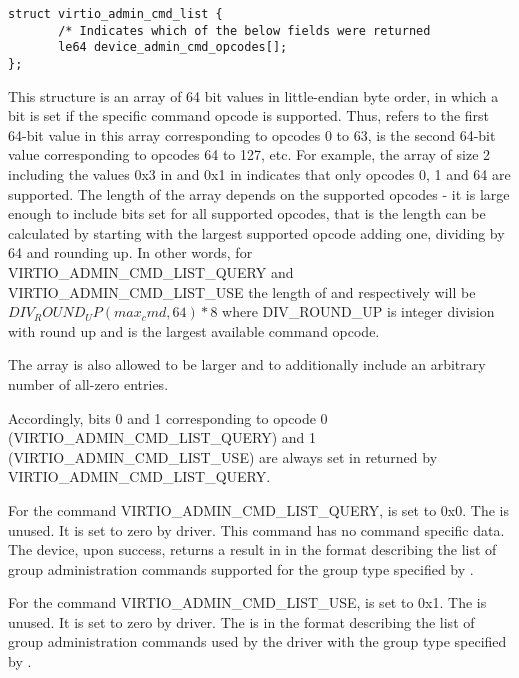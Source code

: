 \begin{lstlisting}
struct virtio_admin_cmd_list {
       /* Indicates which of the below fields were returned
       le64 device_admin_cmd_opcodes[];
};
\end{lstlisting}

This structure is an array of 64 bit values in little-endian byte
order, in which a bit is set if the specific command opcode
is supported. Thus,  refers to the
first 64-bit value in this array corresponding to opcodes 0 to
63,  is the second 64-bit value
corresponding to opcodes 64 to 127, etc.
For example, the array of size 2 including
the values 0x3 in 
and 0x1 in  indicates that only
opcodes 0, 1 and 64 are supported.
The length of the array depends on the supported opcodes - it is
large enough to include bits set for all supported opcodes,
that is the length can be calculated by starting with the largest
supported opcode adding one, dividing by 64 and rounding up.
In other words, for
VIRTIO_ADMIN_CMD_LIST_QUERY and VIRTIO_ADMIN_CMD_LIST_USE the
length of  and
 respectively will be
$DIV_ROUND_UP(max_cmd, 64) * 8$ where DIV_ROUND_UP is integer division
with round up and  is the largest available command opcode.

The array is also allowed to be larger and to additionally
include an arbitrary number of all-zero entries.

Accordingly, bits 0 and 1 corresponding to opcode 0
(VIRTIO_ADMIN_CMD_LIST_QUERY) and 1
(VIRTIO_ADMIN_CMD_LIST_USE) are
always set in  returned by VIRTIO_ADMIN_CMD_LIST_QUERY.

For the command VIRTIO_ADMIN_CMD_LIST_QUERY,  is set to 0x0.
The  is unused. It is set to zero by driver.
This command has no command specific data.
The device, upon success, returns a result in
 in the format
 describing the
list of group administration commands supported for the group type
specified by .

For the command VIRTIO_ADMIN_CMD_LIST_USE, 
is set to 0x1.
The  is unused. It is set to zero by driver.
The  is in the format
 describing the
list of group administration commands used by the driver
with the group type specified by .

